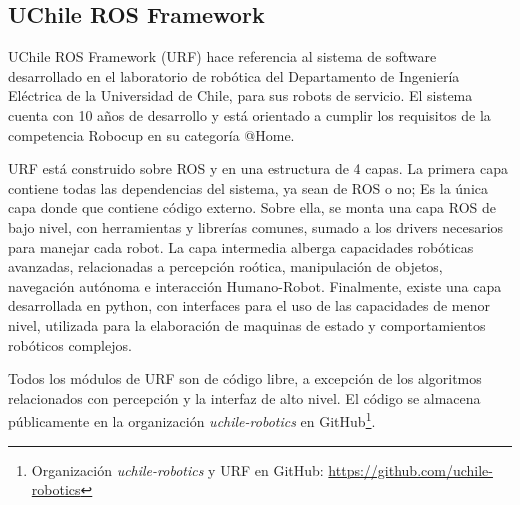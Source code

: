 





\subsection{UChile ROS Framework}

UChile ROS Framework (URF) hace referencia al sistema de software desarrollado en el laboratorio de rob\'otica del Departamento de Ingenier\'ia El\'ectrica de la Universidad de Chile, para sus robots de servicio. El sistema cuenta con 10 a\~nos de desarrollo y est\'a orientado a cumplir los requisitos de la competencia Robocup en su categor\'ia @Home.

URF est\'a construido sobre ROS y en una estructura de 4 capas. La primera capa contiene todas las dependencias del sistema, ya sean de ROS o no; Es la \'unica capa donde que contiene c\'odigo externo. Sobre ella, se monta una capa ROS de bajo nivel, con herramientas y librer\'ias comunes, sumado a los drivers necesarios para manejar cada robot. La capa intermedia alberga capacidades rob\'oticas avanzadas, relacionadas a percepci\'on ro\'otica, manipulaci\'on de objetos, navegaci\'on aut\'onoma e interacci\'on Humano-Robot. Finalmente, existe una capa desarrollada en python, con interfaces para el uso de las capacidades de menor nivel, utilizada para la elaboraci\'on de maquinas de estado y comportamientos rob\'oticos complejos.


Todos los m\'odulos de URF son de c\'odigo libre, a excepci\'on de los algoritmos relacionados con percepci\'on y la interfaz de alto nivel. El c\'odigo se almacena p\'ublicamente en la organizaci\'on \textit{uchile-robotics} en GitHub\footnote{Organizaci\'on \textit{uchile-robotics} y URF en GitHub: \url{https://github.com/uchile-robotics}}.


